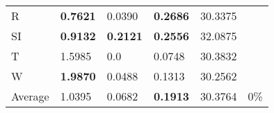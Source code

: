 \documentclass[11pt, a4paper]{article}
\begin{document}
\begin{table}[H]
\begin{tabular}{llllll}
R                                & \textbf{0.7621}                   & 0.0390                            & \textbf{0.2686}                      & 30.3375                                     &                                   \\
SI                        & \textbf{0.9132}                   & \textbf{0.2121}                   & \textbf{0.2556}                      & 32.0875                                     &                                   \\
T                              & 1.5985                            & 0.0                               & 0.0748                               & 30.3832                                     &                                   \\
W                             & \textbf{1.9870}                   & 0.0488                            & 0.1313                               & 30.2562                                     &                                   \\ \hline
Average                               & 1.0395                            & 0.0682                            & \textbf{0.1913}                      & 30.3764                                     & 0\%
\end{tabular}
\end{table}
\end{document}
